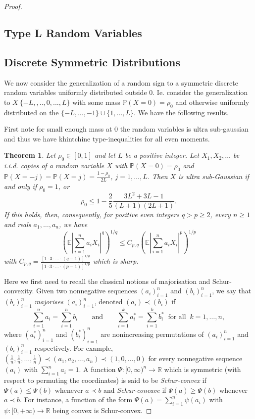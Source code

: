\documentclass[10pt]{article}
\newcommand{\Pp}{\mathbb{P}}
\newcommand{\E}{\mathbb{E}}
\newcommand{\1}{\textbf{1}}
\newcommand{\R}{\mathbb{R}}
\newcommand{\p}[1]{\mathbb{P}\left( #1 \right)}
\newtheorem{theorem}{Theorem}
\theoremstyle{remark}
\theoremstyle{definition}
\begin{document}
\begin{proof}
\subsection{Type L Random Variables}



\subsection{Discrete Symmetric Distributions}

We now consider the generalization of a random sign to a symmetric discrete random variables uniformly distributed outside 0. Ie. consider the generalization to $X ~ \{-L,,..,0,...,L\}$ with some mass $\Pp(X = 0) = \rho_0$ and otherwise uniformly distributed on the $\{-L,...,-1\} \cup \{1,...,L\}$. We have the following results.

First note for small enough mass at 0 the random variables is ultra sub-gaussian and thus we have khintchine type-inequalities for all even moments.

\begin{theorem}\label{thm:USG}
Let $\rho_0 \in [0,1]$ and let $L$ be a positive integer. Let $X_1, X_2,\dots$ be i.i.d. copies of a random variable $X$ with $\p{X=0} = \rho_0$ and $\p{X = -j} = \p{X = j} = \frac{1-\rho_0}{2L}$, $j = 1,\dots,L$. Then $X$ is ultra sub-Gaussian if and only if $\rho_0 = 1$, or
\begin{equation}\label{eq:USG-rho}
\rho_0 \leq 1 - \frac{2}{5}\frac{3L^2+3L-1}{(L+1)(2L+1)}.
\end{equation}
If this holds, then, consequently, for positive even integers $q > p \geq 2$, every $n \geq 1$ and reals $a_1,\dots,a_n$, we have
\begin{equation}\label{eq:Khin-even}
\left(\E\left|\sum_{i=1}^n a_iX_i\right|^q\right)^{1/q} \leq C_{p,q}\left(\E\left|\sum_{i=1}^n a_iX_i\right|^p\right)^{1/p}
\end{equation}
with $C_{p,q} = \frac{[1\cdot 3\cdot\ldots \cdot (q-1)]^{1/q}}{[1\cdot 3\cdot\ldots \cdot (p-1)]^{1/p}}$ which is sharp.
\end{theorem}

 Here we first need to recall the classical notions of majorisation and Schur-convexity. Given two nonnegative sequences $(a_i)_{i=1}^n$ and $(b_i)_{i=1}^n$, we say that $(b_i)_{i=1}^n$ \emph{majorises} $(a_i)_{i=1}^n$, denoted $(a_i) \prec (b_i)$ if
\[
\sum_{i=1}^n a_i = \sum_{i=1}^n b_i \qquad \text{and} \qquad \sum_{i=1}^k a_i^* = \sum_{i=1}^k b_i^* \ \text{ for all } \ k = 1,\ldots,n,
\]
where $(a_i^*)_{i=1}^n$ and $(b_i^*)_{i=1}^n$ are nonincreasing permutations of $(a_i)_{i=1}^n$ and $(b_i)_{i=1}^n$ respectively. For example, $(\frac{1}{n},\frac{1}{n},\dots,\frac{1}{n}) \prec (a_1,a_2,\dots,a_n) \prec (1,0,\dots,0)$ for every nonnegative sequence $(a_i)$ with $\sum_{i=1}^n a_i = 1$. A function $\Psi\colon [0,\infty)^n \to \R$ which is symmetric (with respect to permuting the coordinates) is said to be \emph{Schur-convex} if $\Psi(a) \leq \Psi(b)$ whenever $a \prec b$ and \emph{Schur-concave} if $\Psi(a) \geq \Psi(b)$ whenever $a \prec b$. For instance, a function of the form $\Psi(a) = \sum_{i=1}^n \psi(a_i)$ with $\psi\colon [0,+\infty) \to \R$ being convex is Schur-convex.


\end{proof}
\end{document}
